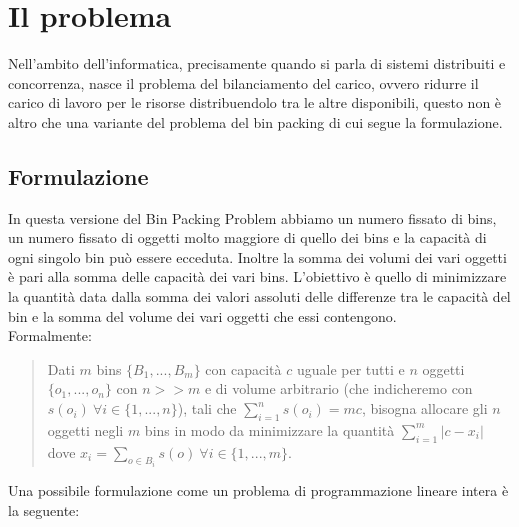 \section{Il problema}
Nell'ambito dell'informatica, precisamente quando si parla di sistemi distribuiti e concorrenza, nasce il problema
del bilanciamento del carico, ovvero ridurre il carico di lavoro per le risorse distribuendolo tra le altre disponibili, questo 
non è altro che una variante del problema del bin packing di cui segue la formulazione.

\subsection{Formulazione}
In questa versione del Bin Packing Problem abbiamo un numero fissato di bins, un numero fissato di oggetti molto maggiore di 
quello dei bins e la capacità di ogni singolo bin può essere ecceduta. Inoltre la somma dei volumi dei vari oggetti è pari alla 
somma delle capacità dei vari bins. L'obiettivo è quello di minimizzare la quantità data dalla somma dei valori assoluti delle 
differenze tra le capacità del bin e la somma del volume dei vari oggetti che essi contengono. \\
Formalmente:
\begin{quote}
	Dati $ m $ bins $ \{B_1, ..., B_m\} $ con capacità $ c $ uguale per tutti e $ n $ oggetti $ \{o_1, ..., o_n\} $ con $ n >> m $ e di volume
	arbitrario (che indicheremo con $ s(o_i) \: \forall i \in \{1, ..., n\} $), tali che $ \displaystyle\sum\limits_{i=1}^{n} s(o_i) = mc $,
	bisogna allocare gli $ n $ oggetti negli $ m $ bins in modo da minimizzare la quantità $ \displaystyle\sum\limits_{i=1}^{m} |c - x_i| $
	dove $ x_i = \displaystyle\sum\limits_{o \in B_i} s(o) \: \forall i \in \{1, ..., m\} $.
\end{quote}
Una possibile formulazione come un problema di programmazione lineare intera è la seguente:
